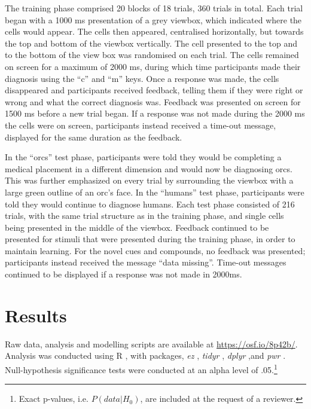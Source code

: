 \documentclass[twocolumn]{article}
\begin{document}
{The training phase comprised 20 blocks of 18 trials, 360 trials in total. Each trial began with a 1000 ms presentation of a grey viewbox, which indicated where the cells would appear. The cells then appeared, centralised horizontally, but towards the top and bottom of the viewbox vertically. The cell presented to the top and to the bottom of the view box was randomised on each trial. The cells remained on screen for a maximum of 2000 ms, during which time participants made their diagnosis using the ``c'' and ``m'' keys. Once a response was made, the cells disappeared and participants received feedback, telling them if they were right or wrong and what the correct diagnosis was. Feedback was presented on screen for 1500 ms before a new trial began. If a response was not made during the 2000 ms the cells were on screen, participants instead received a time-out message, displayed for the same duration as the feedback. 

In the ``orcs'' test phase, participants were told they would be completing a medical placement in a different dimension and would now be diagnosing orcs. This was further emphasized on every trial by surrounding the viewbox with a large green outline of an orc's face. In the ``humans'' test phase, participants were told they would continue to diagnose humans. Each test phase consisted of 216 trials, with the same trial structure as in the training phase, and single cells being presented in the middle of the viewbox. Feedback continued to be presented for stimuli that were presented during the training phase, in order to maintain learning. For the novel cues and compounds, no feedback was presented; participants instead received the message ``data missing''. Time-out messages continued to be displayed if a response was not made in 2000ms. 

\section{Results}

Raw data, analysis and modelling scripts are available at \url{https://osf.io/8p42b/}. Analysis was conducted using R \citep{R2018}, with packages, \emph{ez} \citep{ez2016}, \emph{tidyr} \citep{tidyr2019}, \emph{dplyr} \citep{dplyr2019},and \emph{pwr} \citep{pwr2018}. Null-hypothesis significance tests were conducted at an alpha level of .05.\footnote{Exact p-values, i.e. $P(data|H_{0})$, are included at the request of a reviewer.}

}
\end{document}
